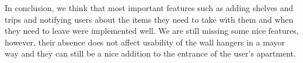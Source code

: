 \documentclass{article}
\begin{document}
In conclusion, we think that most important features such as adding shelves and trips and notifying users about the items they need to take with them and when they need to leave were implemented well. We are still missing some nice features, however, their absence does not affect usability of the wall hangers in a mayor way and they can still be a nice addition to the entrance of the user's apartment.

\newpage





\end{document}
